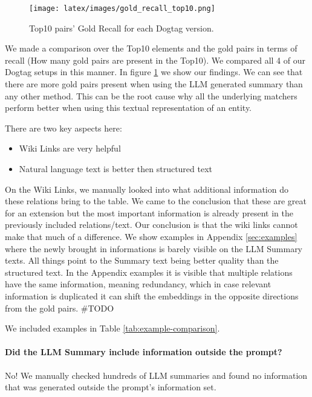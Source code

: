 \documentclass[11pt]{article}
\begin{document}
\begin{figure}[h]
    \texttt{[image: latex/images/gold\_recall\_top10.png]}
    \vspace{-25px}
    \caption{Top10 pairs' Gold Recall for each Dogtag version.}
    \label{fig:gold_recall}
\end{figure}

We made a comparison over the Top10 elements and the gold pairs in terms of recall (How many gold pairs are present in the Top10). We compared all 4 of our Dogtag setups in this manner. In figure \ref{fig:gold_recall} we show our findings. We can see that there are more gold pairs present when using the LLM generated summary than any other method. This can be the root cause why all the underlying matchers perform better when using this textual representation of an entity.

There are two key aspects here:
\begin{itemize}[nosep]
    \setlength\itemsep{0em}
    \setlength\parskip{0em}
    \setlength\parsep{0em}
    \item Wiki Links are very helpful
    \item Natural language text is better then structured text
\end{itemize}

On the Wiki Links, we manually looked into what additional information do these relations bring to the table. We came to the conclusion that these are great for an extension but the most important information is already present in the previously included relations/text. Our conclusion is that the wiki links cannot make that much of a difference. We show examples in Appendix \ref{sec:examples} where the newly brought in informations is barely visible on the LLM Summary texts. All things point to the Summary text being better quality than the structured text. In the Appendix examples it is visible that multiple relations have the same information, meaning redundancy, which in case relevant information is duplicated it can shift the embeddings in the opposite directions from the gold pairs. 
\#TODO


We included examples in Table \ref{tab:example-comparison}. 


\paragraph{Did the LLM Summary include information outside the prompt?}

No! We manually checked hundreds of LLM summaries and found no information that was generated outside the prompt's information set.  
\end{document}
